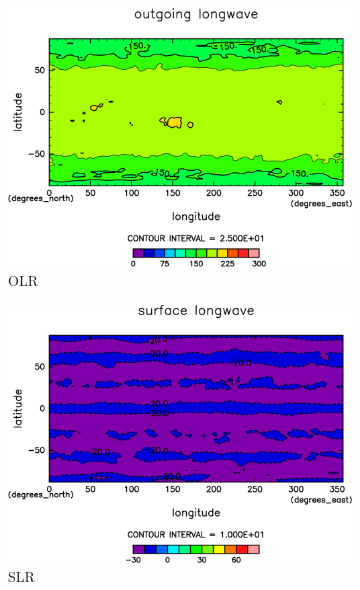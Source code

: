 \documentclass[body]{subfiles}
\begin{document}
\begin{figure}[t]
	\centering
	\begin{subfigure}{.4\textwidth}
		\centering
		\includegraphics[width=\textwidth]{S2000/OLR,time=7300:7665-crop-rotate.pdf}
		\caption{OLR \hmu*{[W/m^{-2}]}}\label{S2000OLR}
	\end{subfigure}
	\begin{subfigure}{.4\textwidth}
		\centering
		\includegraphics[width=\textwidth]{S2000/SLR,time=7300:7665-crop-rotate.pdf}
		\caption{SLR\hmu*{[W/m^{-2}]}}\label{S2000SLR}
	\end{subfigure}
	\begin{subfigure}{.4\textwidth}
		\centering

\end{subfigure}
\end{figure}
\end{document}
